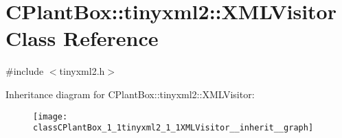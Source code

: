 \hypertarget{classCPlantBox_1_1tinyxml2_1_1XMLVisitor}{}\section{C\+Plant\+Box\+:\+:tinyxml2\+:\+:X\+M\+L\+Visitor Class Reference}
\label{classCPlantBox_1_1tinyxml2_1_1XMLVisitor}


{\ttfamily \#include $<$tinyxml2.\+h$>$}



Inheritance diagram for C\+Plant\+Box\+:\+:tinyxml2\+:\+:X\+M\+L\+Visitor\+:\nopagebreak
\begin{figure}[H]
\begin{center}
\leavevmode
\texttt{[image: classCPlantBox\_1\_1tinyxml2\_1\_1XMLVisitor\_\_inherit\_\_graph]}
\end{center}
\end{figure}
